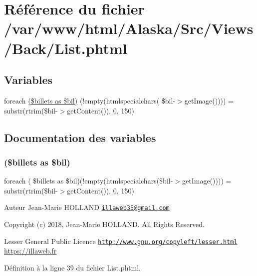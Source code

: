 \hypertarget{_back_2_list_8phtml}{}\section{Référence du fichier /var/www/html/\+Alaska/\+Src/\+Views/\+Back/\+List.phtml}
\label{_back_2_list_8phtml}
\subsection*{Variables}
\begin{DoxyCompactItemize}
\item 
foreach \hyperlink{_back_2_list_8phtml_a6adf298dcf6cb192f46b9acd637b5fb8}{(\$billets as \$bil)} (!empty(htmlspecialchars( \$bil-\/$>$get\+Image()))) = substr(rtrim(\$bil-\/$>$get\+Content()), 0, 150)
\end{DoxyCompactItemize}


\subsection{Documentation des variables}
\mbox{\label{_back_2_list_8phtml_a6adf298dcf6cb192f46b9acd637b5fb8}} 
\subsubsection{\texorpdfstring{(\$billets as \$bil)}{($billets as $bil)}}
{\footnotesize\ttfamily foreach ( \$billets as \$bil)(!empty(htmlspecialchars(\$bil-\/$>$get\+Image()))) = substr(rtrim(\$bil-\/$>$get\+Content()), 0, 150)}

\begin{DoxyAuthor}{Auteur}
Jean-\/\+Marie H\+O\+L\+L\+A\+ND \href{mailto:illaweb35@gmail.com}{\tt illaweb35@gmail.\+com} 
\end{DoxyAuthor}
\begin{DoxyCopyright}{Copyright}
(c) 2018, Jean-\/\+Marie H\+O\+L\+L\+A\+ND. All Rights Reserved.
\end{DoxyCopyright}
Lesser General Public Licence \href{http://www.gnu.org/copyleft/lesser.html}{\tt http\+://www.\+gnu.\+org/copyleft/lesser.\+html} \hyperlink{}{https\+://illaweb.\+fr}

Définition à la ligne 39 du fichier List.\+phtml.

